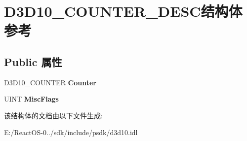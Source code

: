 \hypertarget{struct_d3_d10___c_o_u_n_t_e_r___d_e_s_c}{}\section{D3\+D10\+\_\+\+C\+O\+U\+N\+T\+E\+R\+\_\+\+D\+E\+S\+C结构体 参考}
\label{struct_d3_d10___c_o_u_n_t_e_r___d_e_s_c}
\subsection*{Public 属性}
\begin{DoxyCompactItemize}
\item 
\mbox{\label{struct_d3_d10___c_o_u_n_t_e_r___d_e_s_c_ae03b8b73607ffd0b70bb738c984a0a21}} 
D3\+D10\+\_\+\+C\+O\+U\+N\+T\+ER {\bfseries Counter}
\item 
\mbox{\label{struct_d3_d10___c_o_u_n_t_e_r___d_e_s_c_a2d05ca290995907f7279c2a9f63af0a4}} 
U\+I\+NT {\bfseries Misc\+Flags}
\end{DoxyCompactItemize}


该结构体的文档由以下文件生成\+:\begin{DoxyCompactItemize}
\item 
E\+:/\+React\+O\+S-\/0../sdk/include/psdk/d3d10.\+idl\end{DoxyCompactItemize}
